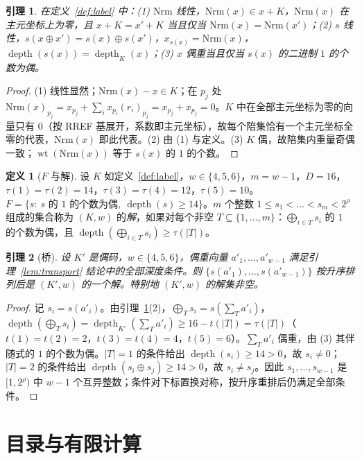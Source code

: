 \documentclass[11pt]{ctexart}
\newtheorem{lemma}{引理}
\theoremstyle{definition}
\newtheorem{definition}{定义}
\newcommand{\wt}{\operatorname{wt}}
\newcommand{\depth}{\operatorname{depth}}
\begin{document}
\begin{lemma}\label{lem:label}
在定义~\ref{def:label} 中：(1) $\mathrm{Nrm}$ 线性，$\mathrm{Nrm}(x)\in x+K$，$\mathrm{Nrm}(x)$ 在主元坐标上为零，且 $x+K=x'+K$ 当且仅当 $\mathrm{Nrm}(x)=\mathrm{Nrm}(x')$；(2) $s$ 线性，$s(x\oplus x')=s(x)\oplus s(x')$，$x_{s(x)}=\mathrm{Nrm}(x)$，$\depth(s(x))=\depth_K(x)$；(3) $x$ 偶重当且仅当 $s(x)$ 的二进制 $1$ 的个数为偶。
\end{lemma}
\begin{proof}
(1) 线性显然；$\mathrm{Nrm}(x)-x\in K$；在 $p_j$ 处 $\mathrm{Nrm}(x)_{p_j}=x_{p_j}+\sum_ix_{p_i}(r_i)_{p_j}=x_{p_j}+x_{p_j}=0$。$K$ 中在全部主元坐标为零的向量只有 $0$（按 RREF 基展开，系数即主元坐标），故每个陪集恰有一个主元坐标全零的代表，$\mathrm{Nrm}(x)$ 即此代表。(2) 由 (1) 与定义。(3) $K$ 偶，故陪集内重量奇偶一致；$\wt(\mathrm{Nrm}(x))$ 等于 $s(x)$ 的 $1$ 的个数。
\end{proof}

\begin{definition}[$F$ 与解]\label{def:solution}
设 $K$ 如定义~\ref{def:label}，$w\in\{4,5,6\}$，$m=w-1$，$D=16$，$\tau(1)=\tau(2)=14$，$\tau(3)=\tau(4)=12$，$\tau(5)=10$。$F=\{s:\ s\text{ 的 }1\text{ 的个数为偶},\ \depth(s)\ge14\}$。$m$ 个整数 $1\le s_1<\dots<s_m<2^\rho$ 组成的集合称为 $(K,w)$ 的\emph{解}，如果对每个非空 $T\subseteq\{1,\dots,m\}$：$\bigoplus_{i\in T}s_i$ 的 $1$ 的个数为偶，且 $\depth(\bigoplus_{i\in T}s_i)\ge\tau(|T|)$。
\end{definition}

\begin{lemma}[桥]\label{lem:bridge}
设 $K'$ 是偶码，$w\in\{4,5,6\}$，偶重向量 $a'_1,\dots,a'_{w-1}$ 满足引理~\ref{lem:transport} 结论中的全部深度条件。则 $\{s(a'_1),\dots,s(a'_{w-1})\}$ 按升序排列后是 $(K',w)$ 的一个解。特别地 $(K',w)$ 的解集非空。
\end{lemma}
\begin{proof}
记 $s_i=s(a'_i)$。由引理~\ref{lem:label}(2)，$\bigoplus_Ts_i=s(\sum_Ta'_i)$，$\depth(\bigoplus_Ts_i)=\depth_{K'}(\sum_Ta'_i)\ge16-t(|T|)=\tau(|T|)$（$t(1)=t(2)=2$，$t(3)=t(4)=4$，$t(5)=6$）。$\sum_Ta'_i$ 偶重，由 (3) 其伴随式的 $1$ 的个数为偶。$|T|=1$ 的条件给出 $\depth(s_i)\ge14>0$，故 $s_i\ne0$；$|T|=2$ 的条件给出 $\depth(s_i\oplus s_j)\ge14>0$，故 $s_i\ne s_j$。因此 $s_1,\dots,s_{w-1}$ 是 $[1,2^\rho)$ 中 $w-1$ 个互异整数；条件对下标置换对称，按升序重排后仍满足全部条件。
\end{proof}

\section{目录与有限计算}\label{sec:comp}
\end{document}
